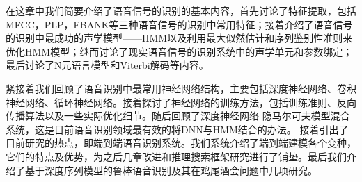 在这章中我们简要介绍了语音信号的识别的基本内容，首先讨论了特征提取，包括MFCC，PLP，FBANK等三种语音信号的识别中常用特征；接着介绍了语音信号的识别中最成功的声学模型——HMM以及利用最大似然估计和序列鉴别性准则来优化HMM模型；继而讨论了现实语音信号的识别系统中的声学单元和参数绑定；最后讨论了N元语言模型和Viterbi解码等内容。

紧接着我们回顾了语音识别中最常用神经网络结构，主要包括深度神经网络、卷积神经网络、循环神经网络。接着探讨了神经网络的训练方法，包括训练准则、反向传播算法以及一些实际优化细节。随后回顾了深度神经网络-隐马尔可夫模型混合系统，这是目前语音识别领域最有效的将DNN与HMM结合的办法。
接着引出了目前研究的热点，即端到端语音识别系统。我们系统介绍了端到端建模各个变种，它们的特点及优势，为之后几章改进和推理搜索框架研究进行了铺垫。最后我们介绍了基于深度序列模型的鲁棒语音识别及其在鸡尾酒会问题中几项研究。